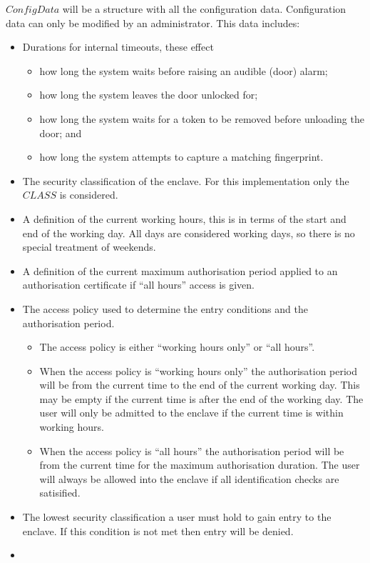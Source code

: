 $ConfigData$ will be a structure with all the configuration data. 
Configuration data can only be modified by an administrator.
This data includes:
\begin{itemize}
\item 
Durations for internal timeouts, these effect
\begin{itemize}
\item
how long the
system waits before raising an audible (door) alarm;
\item
how long the system
leaves the door unlocked for;
\item
how long the system waits for a token to be removed before unloading
the door; and
\item
how long the system attempts to capture a matching fingerprint.
\end{itemize}
\item
The security classification of the enclave. For this implementation
only the $CLASS$ is considered.
\item
A definition of the current working hours, this is in terms of the
start and end of the working day. All days are considered working
days, so there is no special treatment of weekends.
\item 
A definition of the current maximum authorisation period applied to an
authorisation certificate if ``all hours'' access is given.
\item
The access policy used to determine the entry conditions and the 
authorisation period. 
\begin{itemize}
\item
The access policy is either ``working hours only'' or
``all hours''.
\item
When the access policy is ``working hours only'' the authorisation
period will be from the current time to the end of the current working
day. This may be empty if the current time is after the end of the
working day. The user will only be admitted to the enclave if the
current time is within working hours.
\item
When the access policy is ``all hours'' the authorisation period will
be from the current time for the maximum authorisation duration.
The user will always be allowed into the enclave if all identification
checks are satisified.
\end{itemize}
\item
The lowest security classification a user must hold to gain entry to
the enclave. If this condition is not met then entry will be denied.
\item

\end{itemize}
